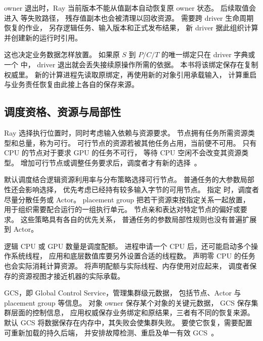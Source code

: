 
owner 退出时，Ray 当前版本不能从值副本自动恢复原 owner 状态。
后续取值会进入  等失败路径，
残存值副本也会被清理以回收资源。
需要跨 driver 生命周期恢复的作业，
另存逻辑任务、输入版本和正式发布结果，
新 driver 据此组织计算并创建新的运行时引用。

这也决定业务数据怎样放置。
如果原 $S$ 到 $P/C/T$ 的唯一绑定只在 driver 字典或一个  中，
driver 退出就会丢失接续原操作所需的依据。
本书将该绑定保存在复制权威里。
新的计算进程先读取原绑定，再使用新的对象引用承载输入，
计算重启与业务责任恢复由此接上各自的保存来源。

\subsection{调度资格、资源与局部性}

Ray 选择执行位置时，同时考虑输入依赖与资源要求。
节点拥有任务所需资源类型和总量，称为可行。
可行节点的资源若被其他任务占用，当前便不可用。
只有 CPU 的节点对于要求 GPU 的任务不可行，
等待 CPU 空闲不会改变其资源类型。
增加可行节点或调整任务要求后，调度者才有新的选择~\cite{ray259-scheduling}。

默认调度结合逻辑资源利用率与分布策略选择可行节点。
普通任务的大参数局部性还会影响选择，
优先考虑已经持有较多输入字节的可用节点。
指定  时，调度者尽量分散任务或 Actor。
placement group 把若干资源束按指定关系一起放置，
用于组织需要配合运行的一组执行单元。
节点亲和表达对特定节点的偏好或要求。
这些策略具有各自的优先关系，
普通任务的参数局部性规则也没有普遍扩展到 Actor。

逻辑 CPU 或 GPU 数量是调度配额。
进程申请一个 CPU 后，还可能启动多个操作系统线程，
应用和底层数值库要另外设置合适的线程数。
声明零 CPU 的任务也会实际消耗计算资源。
将声明配额与实际线程、内存使用对应起来，
调度者保存的资源视图才接近机器的实际承载。


GCS，即 Global Control Service，管理集群级元数据，
包括节点、Actor 与 placement group 等信息。
对象 owner 保存某个对象的关键元数据，
GCS 保存集群层面的控制信息，
应用权威保存业务绑定和原结果，三者有不同的恢复来源。
默认 GCS 将数据保存在内存中，其失败会使集群失败。
要使它恢复，需要配置可重新加载的持久后端，
并安排故障检测、重启及单一有效 GCS~\cite{ray259-gcs}。

